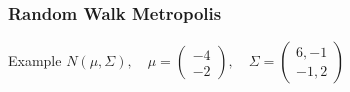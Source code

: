 \begin{frame}
\frametitle{Random Walk Metropolis}
\begin{block}{Example}
$N(\mu, \Sigma), \quad \mu = \begin{pmatrix} -4 \\ -2
\end{pmatrix} , \quad \Sigma = \begin{pmatrix} 6,-1 \\ -1,2
\end{pmatrix}$
\end{block}
\end{frame}